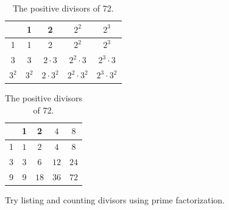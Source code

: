 \begin{exam}
\begin{apart}
\begin{soln}
            \begin{table}[hbtp]
            \centering
                \begin{tabular} {c| |c |c |c |c}
                & 1& 2 & $2^2$ & $2^3$  \\ \hline \hline
                1 & 1 & 2 & $2^2$ & $2^3$ \\ \hline
                3 & 3 & $2 \cdot 3$ & $2^2\cdot 3$ & $2^3\cdot 3$\\ \hline
                $3^2$ & $3^2$ & $2 \cdot 3^2$ & $2^2 \cdot 3^2$& $2^3 \cdot 3^2$ \\ 
                \end{tabular}
                    \hspace{1in}
                \begin{tabular} {c| |c |c |c |c}
                & 1& 2 & $4$ & $8$  \\ \hline \hline
                1 & $1$ & $2$ & $4$ & $8$ \\ \hline
                3 & $3$ & $6$ & $12$ & $24$\\ \hline
                $9$ & $9$ & $18$ & $36$& $72$ \\ 
                \end{tabular}
            \caption{The positive divisors of 72.}
            \label{table_divisors72}
            \end{table}
            \end{soln}
    \end{apart}
\end{exam}

Try listing and counting divisors using prime factorization.

